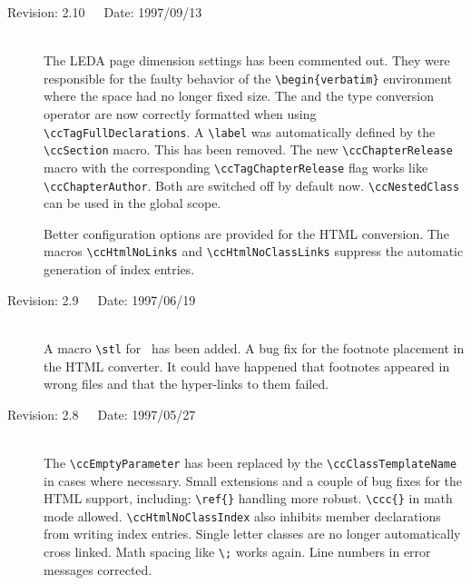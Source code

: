 \documentclass[11pt]{article}
\begin{document}
\begin{description}
    \item[Revision: 2.10~~~Date: 1997/09/13]~\\[3mm]
    The LEDA page dimension settings has been commented out. They were
    responsible for the faulty behavior of the \verb+\begin{verbatim}+
    environment where the space had no longer fixed size. The
     and the type conversion operator are now correctly
    formatted when using \verb+\ccTagFullDeclarations+.  A \verb+\label+
    was automatically defined by the \verb+\ccSection+ macro. This has
    been removed. The new \verb+\ccChapterRelease+ macro with the
    corresponding \verb+\ccTagChapterRelease+ flag works like
    \verb+\ccChapterAuthor+. Both are switched off by default now.
    \verb+\ccNestedClass+ can be used in the global scope.

    Better configuration options are provided for the HTML conversion.
    The macros \verb+\ccHtmlNoLinks+ and \verb+\ccHtmlNoClassLinks+
    suppress the automatic generation of index entries.


    \item[Revision: 2.9~~~Date: 1997/06/19]~\\[3mm]
    A macro \verb+\stl+ for \stl\ has been added. A bug fix for the
    footnote placement in the HTML converter. It could have happened that
    footnotes appeared in wrong files and that the hyper-links to them
    failed.

    \item[Revision: 2.8~~~Date: 1997/05/27]~\\[3mm]
    The \verb+\ccEmptyParameter+ has been replaced by the
    \verb+\ccClassTemplateName+ in cases where necessary. Small extensions
    and a couple of bug fixes for the HTML support, including:
    \verb+\ref{}+ handling more robust. \verb+\ccc{}+ in math mode
    allowed. \verb+\ccHtmlNoClassIndex+ also inhibits member declarations
    from writing index entries. Single letter classes are no longer
    automatically cross linked. Math spacing like \verb+\;+ works again. Line
    numbers in error messages corrected. 


\end{description}
\end{document}
